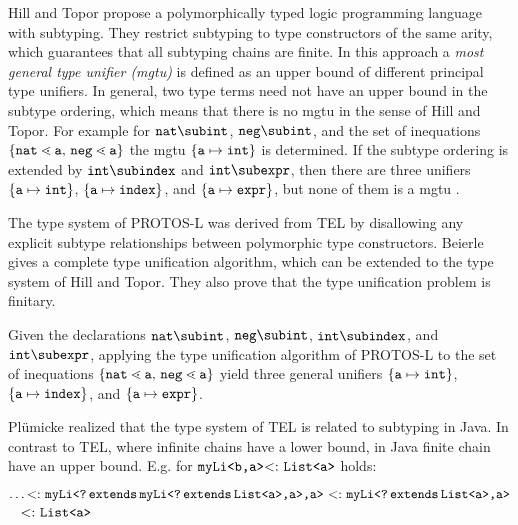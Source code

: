 Hill and Topor  \cite{HiTo92} propose a polymorphically typed logic
programming language with subtyping. They restrict subtyping to type
constructors of the same arity,  which guarantees that all subtyping
chains are finite.
In this approach a \emph{most general type unifier (mgtu)} is
defined as an upper bound of different principal type unifiers. In
general, two type terms need not have an upper bound in the subtype ordering,
which means that there is no mgtu in the sense of Hill and Topor.
For example for  $\texttt{nat} \sub \texttt{int}$, $\texttt{neg} 
\sub \texttt{int}$, and the set of inequations $\set{\mathtt{nat} \lessdot
  \mathtt{a}$, $\mathtt{neg} \lessdot \mathtt{a}}$ the mgtu $\{ \mathtt{a} \mapsto \texttt{int} \}$ is
determined. If the subtype ordering is extended by $\mathtt{int} \sub
\mathtt{index}$ and $\mathtt{int} \sub \mathtt{expr}$, then there are three
unifiers $\{ \mathtt{a} \mapsto \texttt{int} \}$, $\{ \mathtt{a} \mapsto
  \mathtt{index} \}$, and $\{ \mathtt{a} \mapsto 
\mathtt{expr} \}$, but none of them is a mgtu \cite{HiTo92}.

The type system of \textsf{PROTOS-L} \cite{CB95} was
derived from \textsf{TEL} by disallowing any explicit subtype relationships
between polymorphic type constructors. 
Beierle \cite{CB95} gives a complete type unification algorithm, which can be extended to the
type system of Hill and Topor.
They also prove that the type unification problem is finitary.

Given the declarations  $\texttt{nat} \sub
\texttt{int}$, $\texttt{neg} \sub \texttt{int}$, $\mathtt{int} \sub
\mathtt{index}$, and $\mathtt{int} \sub \mathtt{expr}$, applying the
type unification algorithm of \textsf{PROTOS-L} to the set of
inequations $\set{\mathtt{nat} \lessdot
  \mathtt{a}$, $\mathtt{neg} \lessdot \mathtt{a}}$ yield three general
unifiers $\{ \mathtt{a} \mapsto \texttt{int} \}$, $\{ \mathtt{a} \mapsto
  \mathtt{index} \}$, and $\{ \mathtt{a} \mapsto \mathtt{expr} \}$. 

Pl\"umicke \cite{plue09_1} realized that the type system of
\textsf{TEL} is related to subtyping in Java.
In contrast to \textsf{TEL}, where infinite chains have a lower bound, 
in Java finite chain have an upper bound. E.g. for $\texttt{myLi}\textrm{{\tt <b,a}}\textrm{{\tt >}} \textrm{$<:$}\  \texttt{List}\textrm{{\tt <a}}\textrm{{\tt >}}$ holds:

\smallskip
\noindent
$\ldots \textrm{$<:$}\ 
\texttt{myLi}\textrm{{\tt <\texttt{?\,extends\,myLi}\textrm{{\tt <\texttt{\textrm{{\tt ?}}\,extends\,List}\textrm{{\tt <a}}\textrm{{\tt >}},a}}\textrm{{\tt >}},a}}\textrm{{\tt >}}
\ \textrm{$<:$}\  \texttt{myLi}\textrm{{\tt <\texttt{?\,extends\,List}\textrm{{\tt <a}}\textrm{{\tt >}},a}}\textrm{{\tt >}}$\\
\mbox{ } \hfill $\textrm{$<:$}\ 
\texttt{List}\textrm{{\tt <a}}\textrm{{\tt >}}$\\


